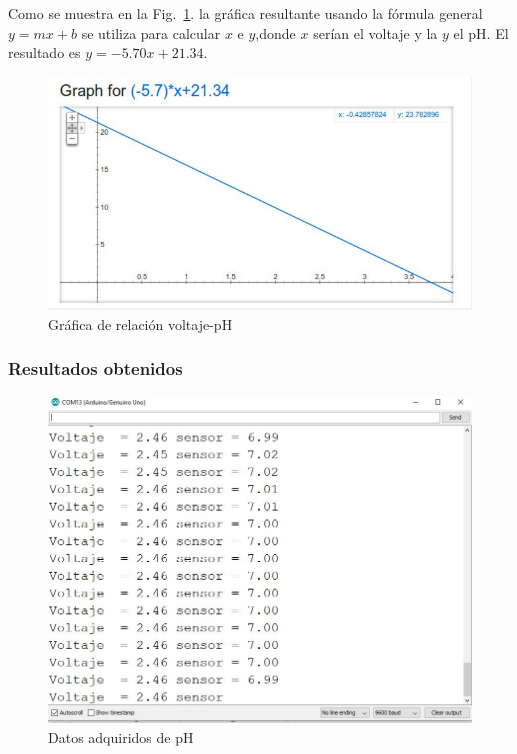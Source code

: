 \documentclass[10pt,a4paper]{article}
\begin{document}
Como se muestra en la Fig.~\ref{volt-ph}.  la gráfica resultante usando la fórmula general $y = mx + b$ se utiliza para calcular $x$ e $y$,donde  $x$  serían el voltaje y la $y$ el pH. El resultado es $ y = -5.70x + 21.34$.
\begin{figure}[H]
\centering
\includegraphics[scale=0.6]{calibradorPH.PNG}
\caption{Gráfica de relación voltaje-pH}
\label{volt-ph}
\end{figure}


\subsubsection*{Resultados obtenidos}
\begin{figure}[H]
\centering
\includegraphics[scale=0.7]{Resultados/resPh}
\caption{Datos adquiridos de pH}
\end{figure}
\end{document}
